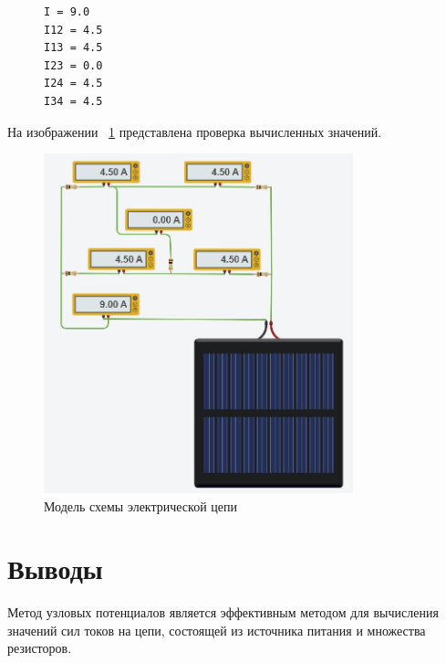 \documentclass[a4paper, 14pt]{extarticle}
\begin{document}
\begin{figure}[!htb]
\begin{lstlisting}[caption={Вывод программы},label={lst:code2}]
I = 9.0
I12 = 4.5
I13 = 4.5
I23 = 0.0
I24 = 4.5
I34 = 4.5
\end{lstlisting}
\end{figure}

На изображении ~\ref{fig:img3} представлена проверка вычисленных значений.

\begin{figure}[!htb]
	\centering
	\includegraphics[width=0.8\textwidth]{img3}
\caption{Модель схемы электрической цепи}
\label{fig:img3}
\end{figure}

\section{Выводы}\label{Sect::conclusion}

Метод узловых потенциалов является эффективным методом для вычисления значений сил токов на цепи, состоящей из источника питания и множества резисторов.
\end{document}
